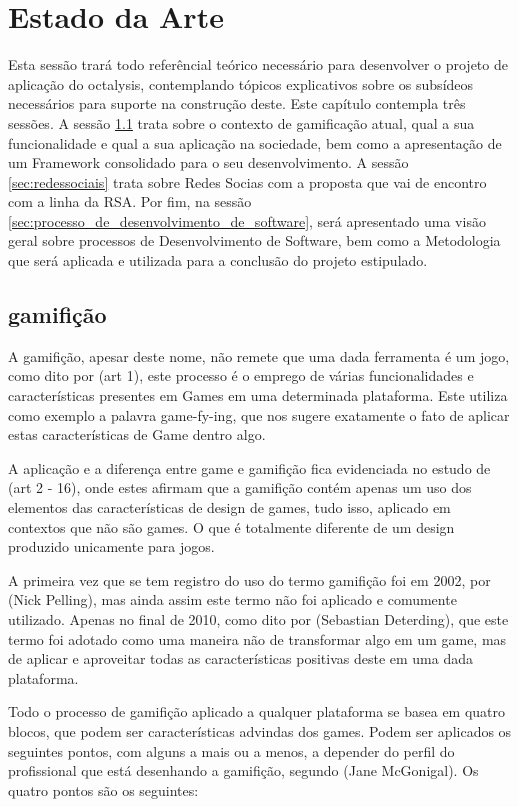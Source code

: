 \chapter[Estado da Arte]{Estado da Arte}
Esta sessão trará todo referêncial teórico necessário para desenvolver o projeto
de aplicação do octalysis, contemplando tópicos explicativos sobre os subsídeos
necessários para suporte na construção deste. Este capítulo contempla três sessões.
A sessão \ref{sec:gamifição} trata sobre o contexto de gamificação atual, qual a
sua funcionalidade e qual a sua aplicação na sociedade, bem como a apresentação
de um Framework consolidado para o seu desenvolvimento. A sessão \ref{sec:redessociais}
trata sobre Redes Socias com a proposta que vai de encontro com a linha da RSA.
Por fim, na sessão \ref{sec:processo_de_desenvolvimento_de_software},
será apresentado uma visão geral sobre processos de
Desenvolvimento de Software, bem como a Metodologia que será aplicada e utilizada
para a conclusão do projeto estipulado.

\section{gamifição}
\label{sec:gamifição}
A gamifição, apesar deste nome, não remete que uma dada ferramenta é um jogo,
como dito por (art 1), este processo é o emprego de
várias funcionalidades e características presentes em Games em uma determinada
plataforma. Este utiliza como exemplo a palavra game-fy-ing, que nos sugere
exatamente o fato de aplicar estas características de Game dentro algo.

A aplicação e a diferença entre game e gamifição fica evidenciada
no estudo de (art 2 - 16), onde estes afirmam que a gamifição contém  apenas
um uso dos elementos das características de design de games, tudo isso,
aplicado em contextos que não são games. O que é totalmente diferente
de um design produzido unicamente para jogos.

A primeira vez que se tem registro do uso do termo gamifição foi em 2002,
por (Nick Pelling), mas ainda assim este termo não foi aplicado e comumente
utilizado. Apenas no final de 2010, como dito por (Sebastian Deterding), que
este termo foi adotado como uma maneira não de transformar algo em um game,
mas de aplicar e aproveitar todas as características positivas deste em uma dada
plataforma.

Todo o processo de gamifição aplicado a qualquer plataforma se basea em
quatro blocos, que podem ser características advindas dos games. Podem ser
aplicados os seguintes pontos, com alguns a mais ou a menos, a depender
do perfil do profissional que está desenhando a gamifição, segundo (Jane McGonigal).
Os quatro pontos são os seguintes:

